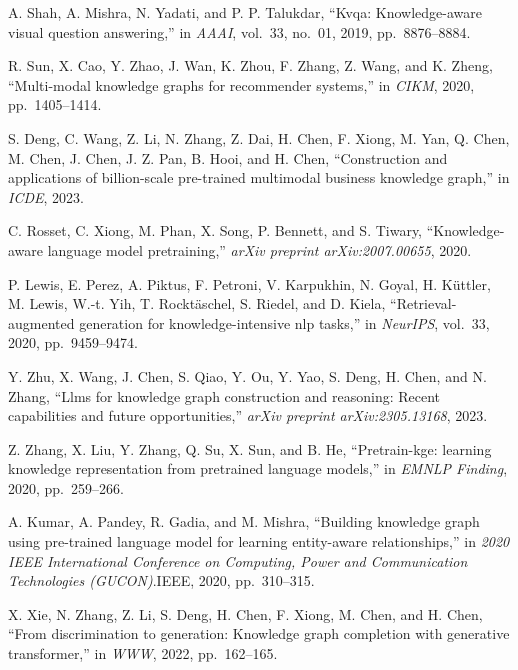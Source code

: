 \begin{enumerate}[leftmargin=2em,label={[\arabic*]}]
\item A. Shah, A. Mishra, N. Yadati, and P. P. Talukdar, ``Kvqa: Knowledge-aware visual question answering,'' in \textit{AAAI}, vol.~33, no.~01, 2019, pp.~8876--8884.

\item R. Sun, X. Cao, Y. Zhao, J. Wan, K. Zhou, F. Zhang, Z. Wang, and K. Zheng, ``Multi-modal knowledge graphs for recommender systems,'' in \textit{CIKM}, 2020, pp.~1405--1414.

\item S. Deng, C. Wang, Z. Li, N. Zhang, Z. Dai, H. Chen, F. Xiong, M. Yan, Q. Chen, M. Chen, J. Chen, J. Z. Pan, B. Hooi, and H. Chen, ``Construction and applications of billion-scale pre-trained multimodal business knowledge graph,'' in \textit{ICDE}, 2023.

\item C. Rosset, C. Xiong, M. Phan, X. Song, P. Bennett, and S. Tiwary, ``Knowledge-aware language model pretraining,'' \textit{arXiv preprint arXiv:2007.00655}, 2020.

\item P. Lewis, E. Perez, A. Piktus, F. Petroni, V. Karpukhin, N. Goyal, H. K\"{u}ttler, M. Lewis, W.-t. Yih, T. Rockt\"{a}schel, S. Riedel, and D. Kiela, ``Retrieval-augmented generation for knowledge-intensive nlp tasks,'' in \textit{NeurIPS}, vol.~33, 2020, pp.~9459--9474.

\item Y. Zhu, X. Wang, J. Chen, S. Qiao, Y. Ou, Y. Yao, S. Deng, H. Chen, and N. Zhang, ``Llms for knowledge graph construction and reasoning: Recent capabilities and future opportunities,'' \textit{arXiv preprint arXiv:2305.13168}, 2023.

\item Z. Zhang, X. Liu, Y. Zhang, Q. Su, X. Sun, and B. He, ``Pretrain-kge: learning knowledge representation from pretrained language models,'' in \textit{EMNLP Finding}, 2020, pp.~259--266.

\item A. Kumar, A. Pandey, R. Gadia, and M. Mishra, ``Building knowledge graph using pre-trained language model for learning entity-aware relationships,'' in \textit{2020 IEEE International Conference on Computing, Power and Communication Technologies (GUCON)}.\quad IEEE, 2020, pp.~310--315.

\item X. Xie, N. Zhang, Z. Li, S. Deng, H. Chen, F. Xiong, M. Chen, and H. Chen, ``From discrimination to generation: Knowledge graph completion with generative transformer,'' in \textit{WWW}, 2022, pp.~162--165.


\end{enumerate}

